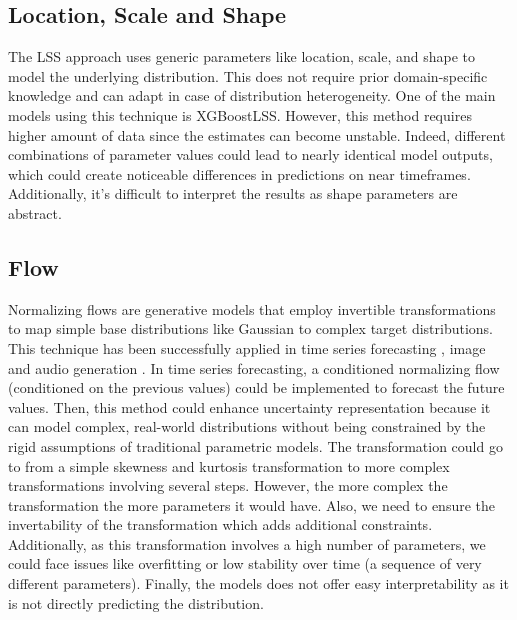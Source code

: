 \documentclass[12pt,a4paper]{book}
\begin{document}
\subsection{Location, Scale and Shape}
The LSS approach \citep{marz_xgboostlss_2019} uses generic parameters like location, scale, and shape to model the underlying distribution. This does not require prior domain-specific knowledge and can adapt in case of distribution heterogeneity. One of the main models using this technique is XGBoostLSS. However, this method requires higher amount of data since the estimates can become unstable. Indeed, different combinations of parameter values could lead to nearly identical model outputs, which could create noticeable differences in predictions on near timeframes. Additionally, it's difficult to interpret the results as shape parameters are abstract.

\subsection{Flow}
Normalizing flows are generative models that employ invertible transformations to map simple base distributions like Gaussian to complex target distributions. This technique has been successfully applied in time series forecasting \citep{flowtimerasul_multivariate_2021}, image \citep{imagetan_flowvqtalker:_2024} and audio generation \citep{flowaudiobilinski_creating_2023}. In time series forecasting, a conditioned normalizing flow (conditioned on the previous values) could be implemented to forecast the future values. Then, this method could enhance uncertainty representation because it can model complex, real-world distributions without being constrained by the rigid assumptions of traditional parametric models. The transformation could go to from a simple skewness and kurtosis transformation to more complex transformations involving several steps. However, the more complex the transformation the more parameters it would have. Also, we need to ensure the invertability of the transformation which adds additional constraints.  Additionally, as this transformation involves a high number of parameters, we could face issues like  overfitting or low stability over time (a sequence of very different parameters). Finally, the models does not offer easy interpretability as it is not directly predicting the distribution. 
\end{document}
